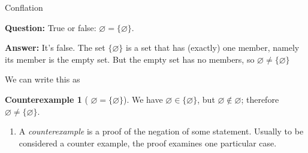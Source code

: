 \documentclass[fleqn]{beamer}
\theoremstyle{definition}
\newtheorem{mycounterexample}{Counterexample}
\newenvironment{checklist}{
  \begin{enumerate}[\ding{51}]
    \addtolength{\itemsep}{-0.0\itemsep}}
  {\end{enumerate}}
\begin{document}
\begin{frame}{Conflation}

\textbf{Question:}  True or false:  \(\varnothing = \{\varnothing \}\).


\vspace{0.2in}

\textbf{Answer:} It's false.  The set   \( \{\varnothing \}\) is a set that has (exactly) one member, namely its member is the empty set.  But the empty set has no members, so
\(
     \varnothing \neq  \{\varnothing \}
\)

\vspace{0.2in}

We can write this as

\vspace{0.2in}

\begin{mycounterexample}[  \( \varnothing = \{\varnothing \}\)]   We have  \( \varnothing \in  \{\varnothing \}\), but \( \varnothing  \notin  \varnothing\); therefore
  \( \varnothing \neq  \{\varnothing \}\).
\end{mycounterexample}


\begin{checklist}

\item A  \emph{counterexample} is a proof of the negation of some statement.  Usually to be considered a counter example, the proof examines one particular case.

\end{checklist}

\end{frame}
\end{document}
